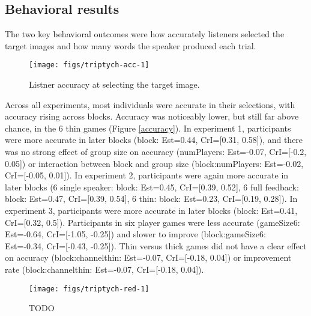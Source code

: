 \documentclass[
  english,
  a4paper,
]{article}
\begin{document}
\hypertarget{behavioral-results}{%
\subsection{Behavioral results}\label{behavioral-results}}

The two key behavioral outcomes were how accurately listeners selected the target images and how many words the speaker produced each trial.

\begin{figure*}[t!]

{\centering \texttt{[image: figs/triptych-acc-1]} 

}

\caption{Listner accuracy at selecting the target image. }\label{fig:triptych-acc}
\end{figure*}

Across all experiments, most individuals were accurate in their selections, with accuracy rising across blocks. Accuracy was noticeably lower, but still far above chance, in the 6 thin games (Figure \ref{accuracy}). In experiment 1, participants were more accurate in later blocks (block: Est=0.44, CrI={[}0.31, 0.58{]}), and there was no strong effect of group size on accuracy (numPlayers: Est=-0.07, CrI={[}-0.2, 0.05{]}) or interaction between block and group size (block:numPlayers: Est=-0.02, CrI={[}-0.05, 0.01{]}). In experiment 2, participants were again more accurate in later blocks (6 single speaker: block: Est=0.45, CrI={[}0.39, 0.52{]}, 6 full feedback: block: Est=0.47, CrI={[}0.39, 0.54{]}, 6 thin: block: Est=0.23, CrI={[}0.19, 0.28{]}). In experiment 3, participants were more accurate in later blocks (block: Est=0.41, CrI={[}0.32, 0.5{]}). Participants in six player games were less accurate (gameSize6: Est=-0.64, CrI={[}-1.05, -0.25{]}) and slower to improve (block:gameSize6: Est=-0.34, CrI={[}-0.43, -0.25{]}). Thin versus thick games did not have a clear effect on accuracy (block:channelthin: Est=-0.07, CrI={[}-0.18, 0.04{]}) or improvement rate (block:channelthin: Est=-0.07, CrI={[}-0.18, 0.04{]}).

\begin{figure*}[t!]

{\centering \texttt{[image: figs/triptych-red-1]} 

}

\caption{TODO}\label{fig:triptych-red}
\end{figure*}
\end{document}
